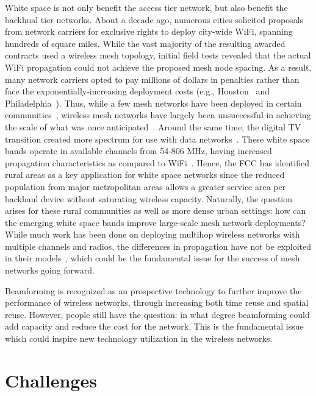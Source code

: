 White space is not only benefit the access tier network, but also benefit the 
backhual tier networks. About a decade ago, numerous cities solicited proposals from
network carriers for exclusive rights to deploy city-wide WiFi,
spanning hundreds of square miles.  
While the vast majority of the resulting awarded contracts used
a wireless mesh topology, initial field tests revealed that the 
actual WiFi propagation could not achieve the proposed mesh node
spacing. As a result, many network carriers opted to pay millions of 
dollars in penalties rather than face the exponentially-increasing
deployment costs (e.g., Houston~\cite{cnet_aug07} and 
Philadelphia~\cite{arstechnica_may08}). Thus, while a few mesh 
networks have been deployed in certain communities~\cite{CRSK06,google_imc08},
wireless mesh networks have largely been unsuccessful in achieving 
the scale of what was once anticipated~\cite{taps}.
Around the same time, the digital TV transition created more
spectrum for use with data networks~\cite{fccwhitespace}. These white 
space bands operate in available channels from 54-806 MHz, having
increased propagation characteristics as compared to 
WiFi~\cite{balanis2012antenna}. Hence, the FCC has identified rural
areas as a key application for white space networks since the reduced
population from major metropolitan areas allows a greater service area
per backhaul device without saturating wireless capacity. Naturally, 
the question arises for these rural communities as well as more dense 
urban settings: how can the emerging white space bands improve 
large-scale mesh network deployments?  While much work has been done 
on deploying multihop wireless networks with multiple channels and 
radios, the differences in propagation have not be exploited in their 
models~\cite{raniwala2004centralized,tang2005interference, si2010overview}, 
which could be the fundamental issue for the success of mesh 
networks going forward.

Beamforming is recognized as an prospective technology to 
further improve the performance of wireless networks, 
through increasing both time reuse and spatial reuse. However,
people still have the question: in what degree beamforming could 
add capacity and reduce the cost for the network. This is the 
fundamental issue which could inspire new technology utilization
in the wireless networks.

\section{Challenges}

